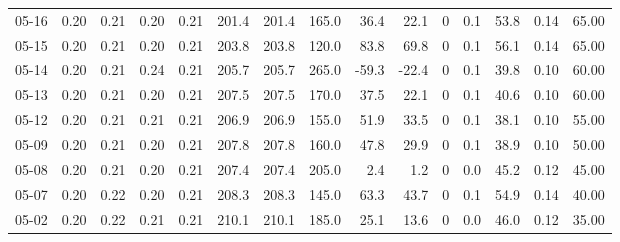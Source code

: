 \begin{threeparttable}
{\begin{tabular}{lrrrrrrrrrrrrrr}
  05-16 &          0.20 &          0.21 &          0.20 &        0.21 &               201.4 &              201.4 &               165.0 &       36.4 &         22.1 &              0 &                 0.1 &             53.8 &            0.14 &                  65.00 \\
  05-15 &          0.20 &          0.21 &          0.20 &        0.21 &               203.8 &              203.8 &               120.0 &       83.8 &         69.8 &              0 &                 0.1 &             56.1 &            0.14 &                  65.00 \\
  05-14 &          0.20 &          0.21 &          0.24 &        0.21 &               205.7 &              205.7 &               265.0 &      -59.3 &        -22.4 &              0 &                 0.1 &             39.8 &            0.10 &                  60.00 \\
  05-13 &          0.20 &          0.21 &          0.20 &        0.21 &               207.5 &              207.5 &               170.0 &       37.5 &         22.1 &              0 &                 0.1 &             40.6 &            0.10 &                  60.00 \\
  05-12 &          0.20 &          0.21 &          0.21 &        0.21 &               206.9 &              206.9 &               155.0 &       51.9 &         33.5 &              0 &                 0.1 &             38.1 &            0.10 &                  55.00 \\
  05-09 &          0.20 &          0.21 &          0.20 &        0.21 &               207.8 &              207.8 &               160.0 &       47.8 &         29.9 &              0 &                 0.1 &             38.9 &            0.10 &                  50.00 \\
  05-08 &          0.20 &          0.21 &          0.20 &        0.21 &               207.4 &              207.4 &               205.0 &        2.4 &          1.2 &              0 &                 0.0 &             45.2 &            0.12 &                  45.00 \\
  05-07 &          0.20 &          0.22 &          0.20 &        0.21 &               208.3 &              208.3 &               145.0 &       63.3 &         43.7 &              0 &                 0.1 &             54.9 &            0.14 &                  40.00 \\
  05-02 &          0.20 &          0.22 &          0.21 &        0.21 &               210.1 &              210.1 &               185.0 &       25.1 &         13.6 &              0 &                 0.0 &             46.0 &            0.12 &                  35.00 \\

\end{tabular}}
\end{threeparttable}
